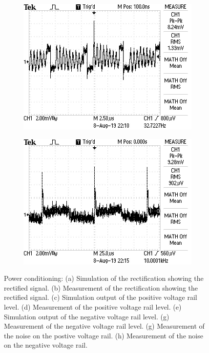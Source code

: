 \begin{figure}
\begin{subfigure}[]{0.35\textwidth}
  		\includegraphics[width=1\linewidth]{./Figures/pwr_meas_noise_pos.JPG}
		    \caption{} \label{subfig:pwr_meas_noise_pos}
     \end{subfigure}
    \begin{subfigure}[]{0.35\textwidth}
             \centering
  		\includegraphics[width=1.0\linewidth]{./Figures/pwr_meas_noise_neg.JPG}
		   \caption{ } \label{subfig:pwr_meas_noise_neg}
     \end{subfigure}
   \caption[Measured regulated output voltage plots]{Power conditioning: (a) Simulation of the rectification showing the rectified signal. (b)  Measurement of the rectification showing the rectified signal.  (c)  Simulation output of the positive voltage rail level. (d) Measurement of the positive voltage rail level. (e)  Simulation output of the negative voltage rail level. (g) Measurement of the negative voltage rail level. (g)  Measurement of the noise on the postive voltage rail. (h) Measurement of the noise on the negative voltage rail. }
    \label{fig:simulation_results_box}
 \end{figure}

